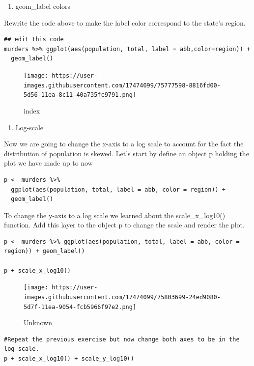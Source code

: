\documentclass[
]{article}
\providecommand{\tightlist}{%
  \setlength{\itemsep}{0pt}\setlength{\parskip}{0pt}}
\begin{document}
\begin{enumerate}
\def\labelenumi{\arabic{enumi}.}
\setcounter{enumi}{11}
\tightlist
\item
  geom\_label colors
\end{enumerate}

Rewrite the code above to make the label color correspond to the state's
region.

\begin{verbatim}
## edit this code
murders %>% ggplot(aes(population, total, label = abb,color=region)) +
  geom_label()
\end{verbatim}

\begin{figure}
\centering
\texttt{[image: https://user-images.githubusercontent.com/17474099/75777598-8816fd00-5d56-11ea-8c11-40a735fc9791.png]}
\caption{index}
\end{figure}

\begin{enumerate}
\def\labelenumi{\arabic{enumi}.}
\setcounter{enumi}{12}
\tightlist
\item
  Log-scale
\end{enumerate}

Now we are going to change the x-axis to a log scale to account for the
fact the distribution of population is skewed. Let's start by define an
object p holding the plot we have made up to now

\begin{verbatim}
p <- murders %>% 
  ggplot(aes(population, total, label = abb, color = region)) +
  geom_label() 
\end{verbatim}

To change the y-axis to a log scale we learned about the
scale\_x\_log10() function. Add this layer to the object p to change the
scale and render the plot.

\begin{verbatim}
p <- murders %>% ggplot(aes(population, total, label = abb, color = region)) + geom_label()

p + scale_x_log10()
\end{verbatim}

\begin{figure}
\centering
\texttt{[image: https://user-images.githubusercontent.com/17474099/75803699-24ed9080-5d7f-11ea-9054-fcb5966f97e2.png]}
\caption{Unknown}
\end{figure}

\begin{verbatim}
#Repeat the previous exercise but now change both axes to be in the log scale.
p + scale_x_log10() + scale_y_log10()
\end{verbatim}
\end{document}

